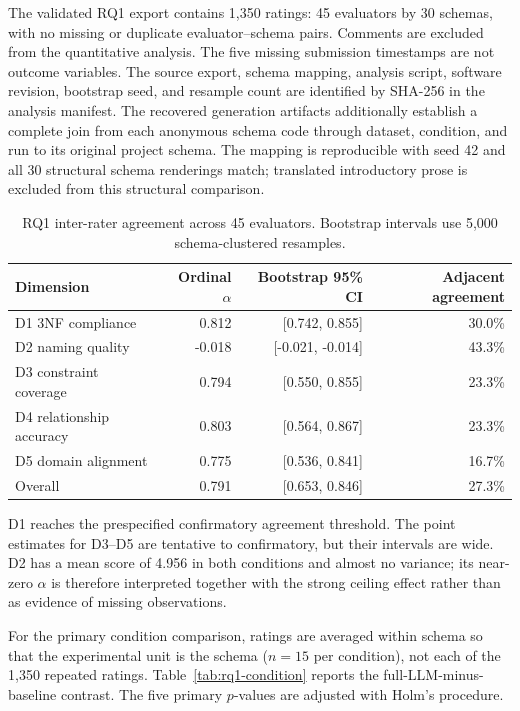 \documentclass[11pt,a4paper]{article}
\begin{document}
The validated RQ1 export contains 1,350 ratings: 45 evaluators by 30 schemas,
with no missing or duplicate evaluator--schema pairs. Comments are excluded
from the quantitative analysis. The five missing submission timestamps are not
outcome variables. The source export, schema mapping, analysis script, software
revision, bootstrap seed, and resample count are identified by SHA-256 in the
analysis manifest.
The recovered generation artifacts additionally establish a complete join from
each anonymous schema code through dataset, condition, and run to its original
project schema. The mapping is reproducible with seed 42 and all 30 structural
schema renderings match; translated introductory prose is excluded from this
structural comparison.

\begin{table}[htbp]
\centering
\begin{tabular}{lrrr}
\toprule
\textbf{Dimension} & \textbf{Ordinal $\alpha$} & \textbf{Bootstrap 95\% CI} & \textbf{Adjacent agreement}\\
\midrule
D1 3NF compliance       & 0.812  & [0.742, 0.855]   & 30.0\%\\
D2 naming quality       & -0.018 & [-0.021, -0.014] & 43.3\%\\
D3 constraint coverage  & 0.794  & [0.550, 0.855]   & 23.3\%\\
D4 relationship accuracy& 0.803  & [0.564, 0.867]   & 23.3\%\\
D5 domain alignment     & 0.775  & [0.536, 0.841]   & 16.7\%\\
Overall                 & 0.791  & [0.653, 0.846]   & 27.3\%\\
\bottomrule
\end{tabular}
\caption{RQ1 inter-rater agreement across 45 evaluators. Bootstrap intervals use 5,000 schema-clustered resamples.}
\label{tab:rq1-agreement}
\end{table}

D1 reaches the prespecified confirmatory agreement threshold. The point
estimates for D3--D5 are tentative to confirmatory, but their intervals are
wide. D2 has a mean score of 4.956 in both conditions and almost no variance;
its near-zero $\alpha$ is therefore interpreted together with the strong
ceiling effect rather than as evidence of missing observations.

For the primary condition comparison, ratings are averaged within schema so
that the experimental unit is the schema ($n=15$ per condition), not each of
the 1,350 repeated ratings. Table~\ref{tab:rq1-condition} reports the
full-LLM-minus-baseline contrast. The five primary $p$-values are adjusted with
Holm's procedure.
\end{document}
